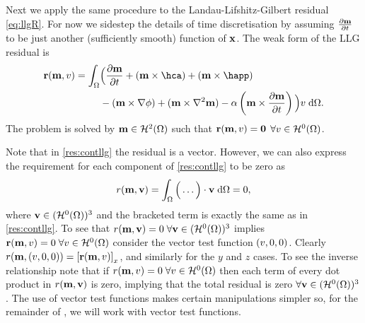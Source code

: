 Next we apply the same procedure to the Landau-Lifshitz-Gilbert residual \cref{eq:llgR}.
For now we sidestep the details of time discretisation by assuming $\frac{\partial \boldsymbol{\mathrm{m}}}{\partial t}$ to be just another (sufficiently smooth) function of $\boldsymbol{\mathrm{x}}$.
The weak form of the LLG residual is
\begin{equation}
  \begin{aligned}
    \rllgv(\mv, \test) = \int_\magd &\Big( \dmdt
    + (\mv \times \hca) + (\mv \times \happ) \\
    &- (\mv \times \grad \phi) + (\mv \times \lap \mv) - \dampc \left( \mv
      \times \dmdt \right) \Big) \test \d\magd.
    \label{res:contllg}
  \end{aligned}
\end{equation}
The problem is solved by $\boldsymbol{\mathrm{m}} \in \mathcal{H}^2(\Omega)$ such that $\boldsymbol{\mathrm{r}}(\boldsymbol{\mathrm{m}}, v) = \mathbf{0}$ $\forall v \in \mathcal{H}^0(\Omega)$.

Note that in \cref{res:contllg} the residual is a vector.
However, we can also express the requirement for each component of \cref{res:contllg} to be zero as
\begin{equation}
  r(\boldsymbol{\mathrm{m}}, \boldsymbol{\mathrm{v}}) = \int_\Omega \Big( \ldots  \Big) \cdot \boldsymbol{\mathrm{v}} {\; \mathrm{{d}}}\Omega = 0,
\end{equation}
where $\boldsymbol{\mathrm{v}} \in (\mathcal{H}^0(\Omega))^3$ and the bracketed term is exactly the same as in \cref{res:contllg}.
To see that $r(\boldsymbol{\mathrm{m}}, \boldsymbol{\mathrm{v}}) = 0\; \forall \boldsymbol{\mathrm{v}} \in (\mathcal{H}^0(\Omega))^3$ implies $\boldsymbol{\mathrm{r}}(\boldsymbol{\mathrm{m}}, v) = 0 \; \forall v \in \mathcal{H}^0(\Omega)$ consider the vector test function $(v, 0, 0)$.
Clearly $r(\boldsymbol{\mathrm{m}}, (v, 0, 0)) = {\left[ \boldsymbol{\mathrm{r}}(\boldsymbol{\mathrm{m}}, v) \right]}_x$, and similarly for the $y$ and $z$ cases.
To see the inverse relationship note that if $r(\boldsymbol{\mathrm{m}}, v) = 0\; \forall v \in \mathcal{H}^0(\Omega)$ then each term of every dot product in $r(\boldsymbol{\mathrm{m}}, \boldsymbol{\mathrm{v}})$ is zero, implying that the total residual is zero $\forall \boldsymbol{\mathrm{v}} \in (\mathcal{H}^0(\Omega))^3$.
The use of vector test functions makes certain manipulations simpler so, for the remainder of , we will work with vector test functions.

